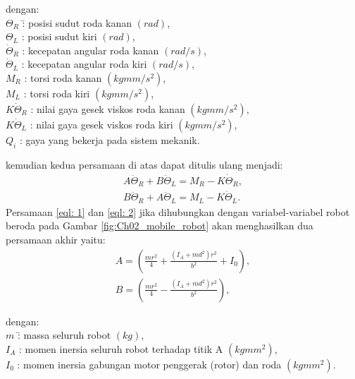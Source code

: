 \begin{tabbing}
dengan: \=\\
        \>$\Theta_R$ \qquad \=: posisi sudut roda kanan $(rad)$,\\ 
        \>$\Theta_L$ \qquad \>: posisi sudut kiri $(rad)$,\\
        \>$\dot{\Theta}_R$ \>: kecepatan angular roda kanan $(rad/s)$,\\
        \>$\dot{\Theta}_L$ \>: kecepatan angular roda kiri $(rad/s)$,\\
        \>$M_R$ \>: torsi roda kanan $(kgmm/s^2)$,\\
        \>$M_L$ \>: torsi roda kiri $(kgmm/s^2)$,\\
        \>$K\dot{\Theta}_R$ \>: nilai gaya gesek viskos roda kanan $(kgmm/s^2)$,\\
        \>$K\dot{\Theta}_L$ \>: nilai gaya gesek viskos roda kiri $(kgmm/s^2)$,\\
        \>$Q_i$ \>: gaya yang bekerja pada sistem mekanik.
\end{tabbing}
kemudian kedua persamaan di atas dapat ditulis ulang menjadi:
\begin{align}
    \label{eql: 1}
    A\ddot{\Theta}_R+B\ddot{\Theta}_L=M_R-K\dot{\Theta}_R,\\
    \label{eql: 2}
    B\ddot{\Theta}_R+A\ddot{\Theta}_L=M_L-K\dot{\Theta}_L.
\end{align}
Persamaan \ref*{eql: 1} dan \ref*{eql: 2} jika dihubungkan dengan variabel-variabel robot beroda pada Gambar \ref*{fig:Ch02_mobile_robot} akan menghasilkan dua persamaan akhir yaitu:
\begin{align}
    \label{eql: 1a}
    A=\left(\frac{mr^2}{4}+\frac{(I_A+md^2)r^2}{b^2}+I_0\right),\\
    \label{eql: 1b}
    B=\left(\frac{mr^2}{4}-\frac{(I_A+md^2)r^2}{b^2}\right),
\end{align}
\begin{tabbing}
    dengan: \=\\
        \>$m$ \qquad \=: massa seluruh robot $(kg)$,\\ 
        \>$I_A$ \>: momen inersia seluruh robot terhadap titik A $(kgmm^2)$,\\
        \>$I_0$ \>: momen inersia gabungan motor penggerak (rotor) dan roda $(kgmm^2)$.
\end{tabbing}


